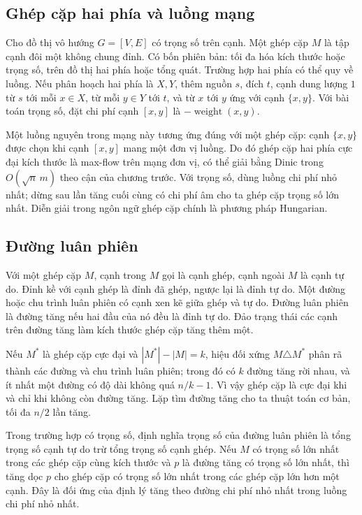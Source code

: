 \documentclass[11pt]{article}
\begin{document}
\subsection*{Ghép cặp hai phía và luồng mạng}

Cho đồ thị vô hướng \(G=[V,E]\) có trọng số trên cạnh. Một ghép cặp \(M\) là
tập cạnh đôi một không chung đỉnh. Có bốn phiên bản: tối đa hóa kích thước hoặc
trọng số, trên đồ thị hai phía hoặc tổng quát. Trường hợp hai phía có thể quy
về luồng. Nếu phân hoạch hai phía là \(X,Y\), thêm nguồn \(s\), đích \(t\), cạnh
dung lượng \(1\) từ \(s\) tới mỗi \(x\in X\), từ mỗi \(y\in Y\) tới \(t\), và từ
\(x\) tới \(y\) ứng với cạnh \(\{x,y\}\). Với bài toán trọng số, đặt chi phí
cạnh \([x,y]\) là \(-\operatorname{weight}(x,y)\).

Một luồng nguyên trong mạng này tương ứng đúng với một ghép cặp: cạnh
\(\{x,y\}\) được chọn khi cạnh \([x,y]\) mang một đơn vị luồng. Do đó ghép cặp
hai phía cực đại kích thước là max-flow trên mạng đơn vị, có thể giải bằng
Dinic trong \(O(\sqrt n\,m)\) theo cận của chương trước. Với trọng số, dùng
luồng chi phí nhỏ nhất; dừng sau lần tăng cuối cùng có chi phí âm cho ta ghép
cặp trọng số lớn nhất. Diễn giải trong ngôn ngữ ghép cặp chính là phương pháp
Hungarian.

\subsection*{Đường luân phiên}

Với một ghép cặp \(M\), cạnh trong \(M\) gọi là cạnh ghép, cạnh ngoài \(M\) là
cạnh tự do. Đỉnh kề với cạnh ghép là đỉnh đã ghép, ngược lại là đỉnh tự
do. Một đường hoặc chu trình luân phiên có cạnh xen kẽ giữa ghép và tự do. Đường
luân phiên là đường tăng nếu hai đầu của nó đều là đỉnh tự do. Đảo trạng thái
các cạnh trên đường tăng làm kích thước ghép cặp tăng thêm một.

Nếu \(M^*\) là ghép cặp cực đại và \(|M^*|-|M|=k\), hiệu đối xứng
\(M\triangle M^*\) phân rã thành các đường và chu trình luân phiên; trong đó có
\(k\) đường tăng rời nhau, và ít nhất một đường có độ dài không quá \(n/k-1\).
Vì vậy ghép cặp là cực đại khi và chỉ khi không còn đường tăng. Lặp tìm đường
tăng cho ta thuật toán cơ bản, tối đa \(n/2\) lần tăng.

Trong trường hợp có trọng số, định nghĩa trọng số của đường luân phiên là tổng
trọng số cạnh tự do trừ tổng trọng số cạnh ghép. Nếu \(M\) có trọng số lớn nhất
trong các ghép cặp cùng kích thước và \(p\) là đường tăng có trọng số lớn nhất,
thì tăng dọc \(p\) cho ghép cặp có trọng số lớn nhất trong các ghép cặp lớn hơn
một cạnh. Đây là đối ứng của định lý tăng theo đường chi phí nhỏ nhất trong
luồng chi phí nhỏ nhất.
\end{document}

